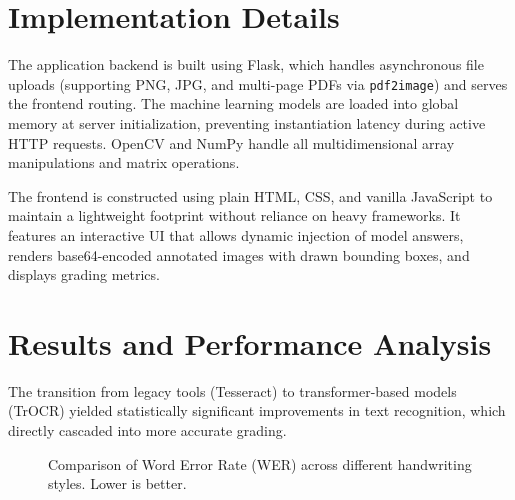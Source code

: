 \documentclass[conference]{IEEEtran}
\begin{document}
\section{Implementation Details}
The application backend is built using Flask, which handles asynchronous file uploads (supporting PNG, JPG, and multi-page PDFs via \texttt{pdf2image}) and serves the frontend routing. The machine learning models are loaded into global memory at server initialization, preventing instantiation latency during active HTTP requests. OpenCV and NumPy handle all multidimensional array manipulations and matrix operations.

The frontend is constructed using plain HTML, CSS, and vanilla JavaScript to maintain a lightweight footprint without reliance on heavy frameworks. It features an interactive UI that allows dynamic injection of model answers, renders base64-encoded annotated images with drawn bounding boxes, and displays grading metrics.

\section{Results and Performance Analysis}
The transition from legacy tools (Tesseract) to transformer-based models (TrOCR) yielded statistically significant improvements in text recognition, which directly cascaded into more accurate grading.

\begin{figure}[htbp]
    \centering
    \caption{Comparison of Word Error Rate (WER) across different handwriting styles. Lower is better.}
    \label{fig:wer_comparison}
\end{figure}
\end{document}

